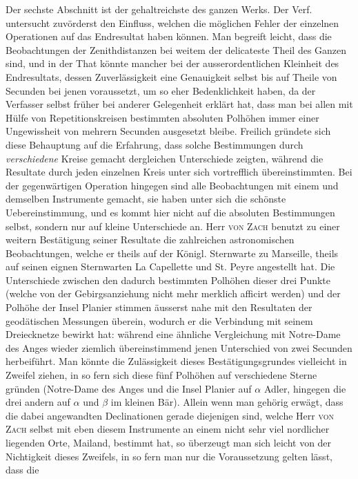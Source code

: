 Der sechste Abschnitt ist der gehaltreichste des ganzen Werks. Der Verf. untersucht
zuvörderst den Einfluss, welchen die möglichen Fehler der einzelnen Operationen auf das
Endresultat haben können. Man begreift leicht, dass die Beobachtungen der Zenithdistanzen bei
weitem der delicateste Theil des Ganzen sind, und in der That könnte mancher bei der
ausserordentlichen Kleinheit des Endresultats, dessen Zuverlässigkeit eine Genauigkeit selbst bis
auf Theile von Secunden bei jenen voraussetzt, um so eher Bedenklichkeit haben, da der Verfasser
selbst früher bei anderer Gelegenheit erklärt hat, dass man bei allen mit Hülfe von
Repetitionskreisen bestimmten absoluten Polhöhen immer einer Ungewissheit von mehrern Secunden
ausgesetzt bleibe. Freilich gründete sich diese Behauptung auf die Erfahrung, dass solche
Bestimmungen durch \emph{verschiedene} Kreise gemacht dergleichen Unterschiede zeigten, während die
Resultate durch jeden einzelnen Kreis unter sich vortrefflich übereinstimmten. Bei der
gegenwärtigen Operation hingegen sind alle Beobachtungen mit einem und demselben Instrumente
gemacht, sie haben unter sich die schönste Uebereinstimmung, und es kommt hier nicht auf die
absoluten Bestimmungen selbst, sondern nur auf kleine Unterschiede an. Herr \textsc{von Zach}
benutzt zu einer weitern Bestätigung seiner Resultate die zahlreichen astronomischen
Beobachtungen, welche er theils auf der Königl. Sternwarte zu Marseille, theils auf seinen eignen
Sternwarten La Capellette und St. Peyre angestellt hat. Die Unterschiede zwischen den dadurch
bestimmten Polhöhen dieser drei Punkte (welche von der Gebirgsanziehung nicht mehr merklich
afficirt werden) 
und der Polhöhe der Insel Planier stimmen äusserst nahe mit den Resultaten der geodätischen
Messungen überein, wodurch er die Verbindung mit seinem Dreiecknetze bewirkt hat: während eine
ähnliche Vergleichung mit Notre-Dame des Anges wieder ziemlich übereinstimmend jenen Unterschied
von zwei Secunden herbeiführt. Man könnte die Zulässigkeit dieses Bestätigungsgrundes vielleicht in
Zweifel ziehen, in so fern sich diese fünf Polhöhen auf verschiedene Sterne gründen (Notre-Dame des
Anges und die Insel Planier auf $\alpha$ Adler, hingegen die drei andern auf $\alpha$ und $\beta$
im kleinen Bär). Allein wenn man gehörig erwägt, dass die dabei angewandten Declinationen gerade
diejenigen sind, welche Herr \textsc{von Zach} selbst mit eben diesem Instrumente an einem nicht
sehr viel nordlicher liegenden Orte, Mailand, bestimmt hat, so überzeugt man sich leicht von der
Nichtigkeit dieses Zweifels, in so fern man nur die Voraussetzung gelten lässt, dass die\par
